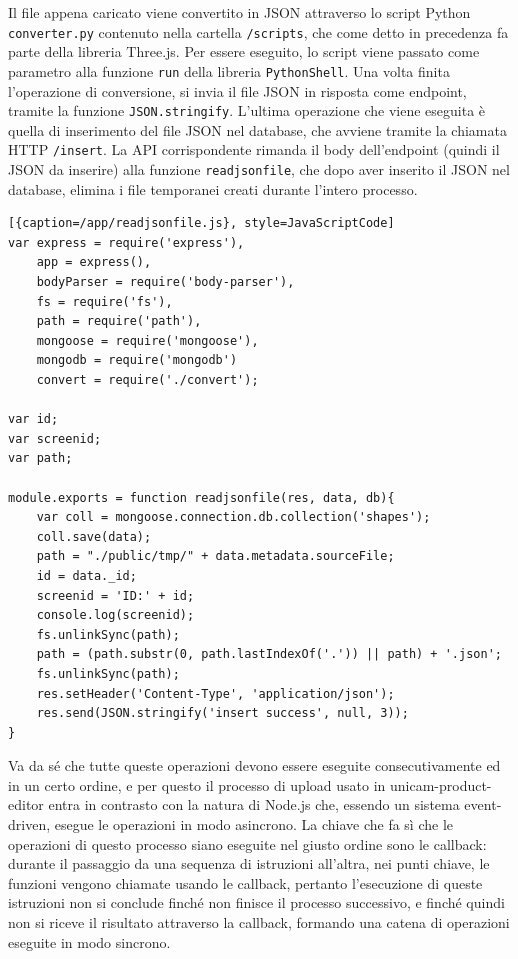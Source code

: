 Il file appena caricato viene convertito in JSON attraverso lo script 
Python \texttt{converter.py} contenuto nella cartella \texttt{/scripts}, 
che come detto in precedenza fa parte della libreria Three.js. Per essere 
eseguito, lo script viene passato come parametro alla funzione \texttt{run} 
della libreria \texttt{PythonShell}. Una volta finita l'operazione di
conversione, si invia il file JSON in risposta come endpoint, tramite la
funzione \texttt{JSON.stringify}. L'ultima operazione che viene eseguita è 
quella di inserimento del file JSON nel database, che avviene tramite la 
chiamata HTTP \texttt{/insert}. La API corrispondente rimanda il body 
dell'endpoint (quindi il JSON da inserire) alla funzione 
\texttt{readjsonfile}, che dopo aver inserito il JSON nel database, elimina 
i file temporanei creati durante l'intero processo.
\begin{lstlisting}[{caption=/app/readjsonfile.js}, style=JavaScriptCode]
var express = require('express'),
	app = express(),
	bodyParser = require('body-parser'),
	fs = require('fs'),
	path = require('path'),
	mongoose = require('mongoose'),
	mongodb = require('mongodb')
	convert = require('./convert');

var id;
var screenid;
var path;

module.exports = function readjsonfile(res, data, db){
	var coll = mongoose.connection.db.collection('shapes');
	coll.save(data);
	path = "./public/tmp/" + data.metadata.sourceFile;
	id = data._id;
	screenid = 'ID:' + id;
	console.log(screenid);
	fs.unlinkSync(path);
	path = (path.substr(0, path.lastIndexOf('.')) || path) + '.json';
	fs.unlinkSync(path);
	res.setHeader('Content-Type', 'application/json');
	res.send(JSON.stringify('insert success', null, 3));
}
\end{lstlisting}

Va da sé che tutte queste operazioni devono essere eseguite consecutivamente ed in un certo ordine, e per questo il processo di upload usato in unicam-product-editor entra in contrasto con la natura di Node.js che, essendo un sistema event-driven, esegue le operazioni in modo asincrono.
La chiave che fa sì che le operazioni di questo processo siano eseguite nel giusto ordine sono le callback: durante il passaggio da una sequenza di istruzioni all'altra, nei punti chiave, le funzioni vengono chiamate usando le callback, pertanto l'esecuzione di queste istruzioni non si conclude finché non finisce il processo successivo, e finché quindi non si riceve il risultato attraverso la callback, formando una catena di operazioni eseguite in modo sincrono.
